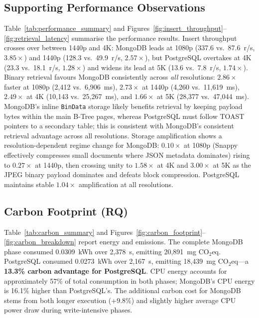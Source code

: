 \documentclass[conference]{IEEEtran}
\begin{document}
\subsection{Supporting Performance Observations}
\label{subsec:performance}
Table~\ref{tab:performance_summary} and Figures~\ref{fig:insert_throughput}--\ref{fig:retrieval_latency} summarise the performance results. Insert throughput crosses over between 1440p and 4K: MongoDB leads at 1080p (337.6 vs.\ 87.6~r/s, $3.85\times$) and 1440p (128.3 vs.\ 49.9~r/s, $2.57\times$), but PostgreSQL overtakes at 4K (23.3 vs.\ 18.1~r/s, $1.28\times$) and widens its lead at 5K (13.6 vs.\ 7.8~r/s, $1.74\times$). Binary retrieval favours MongoDB consistently across \emph{all} resolutions: $2.86\times$ faster at 1080p (2,412 vs.\ 6,906~ms), $2.73\times$ at 1440p (4,260 vs.\ 11,619~ms), $2.49\times$ at 4K (10,143 vs.\ 25,267~ms), and $1.66\times$ at 5K (28,377 vs.\ 47,044~ms). MongoDB's inline \texttt{BinData} storage likely benefits retrieval by keeping payload bytes within the main B-Tree pages, whereas PostgreSQL must follow TOAST pointers to a secondary table; this is consistent with MongoDB's consistent retrieval advantage across all resolutions. Storage amplification shows a resolution-dependent regime change for MongoDB: $0.10\times$ at 1080p (Snappy effectively compresses small documents where JSON metadata dominates) rising to $0.27\times$ at 1440p, then crossing unity to $1.58\times$ at 4K and $3.00\times$ at 5K as the JPEG binary payload dominates and defeats block compression. PostgreSQL maintains stable $1.04\times$ amplification at all resolutions.

\subsection{Carbon Footprint (RQ)}
\label{subsec:carbon_footprint}
Table~\ref{tab:carbon_summary} and Figures~\ref{fig:carbon_footprint}--\ref{fig:carbon_breakdown} report energy and emissions. The complete MongoDB phase consumed 0.0309~kWh over 2,378~s, emitting 20,891~mg CO$_2$eq. PostgreSQL consumed 0.0273~kWh over 2,167~s, emitting 18,439~mg CO$_2$eq---a \textbf{13.3\% carbon advantage for PostgreSQL}. CPU energy accounts for approximately 57\% of total consumption in both phases; MongoDB's CPU energy is 16.1\% higher than PostgreSQL's. The additional carbon cost for MongoDB stems from both longer execution (+9.8\%) and slightly higher average CPU power draw during write-intensive phases.
\end{document}
